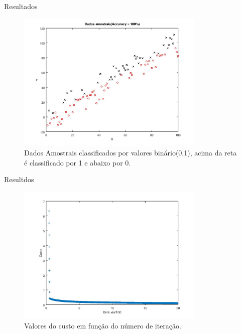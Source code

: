 \documentclass{beamer}
\begin{document}
  \begin{frame}{Resultados}
 	\begin{figure}
 	\centering
    \includegraphics[width= 0.8\textwidth]{Amostra.jpg}
   \caption{Dados Amostrais classificados por valores binário(0,1), acima da reta é classificado por 1 e abaixo por 0. }
 	\end{figure}
  \end{frame}
  \begin{frame}{Resultdos}
  \begin{figure}
  \centering
  \includegraphics[width=0.8\textwidth]{Custo.jpg}
  \caption{Valores do custo em função do número de iteração.}  \end{figure}
  \end{frame}
\end{document}
